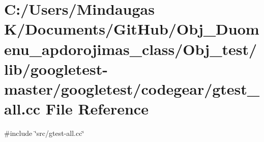 \hypertarget{_obj__test_2lib_2googletest-master_2googletest_2codegear_2gtest__all_8cc}{}\section{C\+:/\+Users/\+Mindaugas K/\+Documents/\+Git\+Hub/\+Obj\+\_\+\+Duomenu\+\_\+apdorojimas\+\_\+class/\+Obj\+\_\+test/lib/googletest-\/master/googletest/codegear/gtest\+\_\+all.cc File Reference}
\label{_obj__test_2lib_2googletest-master_2googletest_2codegear_2gtest__all_8cc}
{\ttfamily \#include \char`\"{}src/gtest-\/all.\+cc\char`\"{}}\newline
